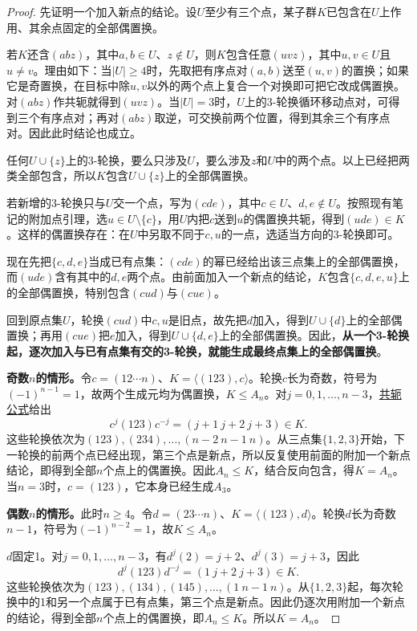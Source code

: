 \documentclass[UTF8,a4paper,11pt,fontset=windows]{ctexart}
\newcommand{\proofref}[2]{\hyperref[note:#1]{#2}}
\begin{document}
\begin{proof}
先证明一个加入新点的结论。设$U$至少有三个点，某子群$K$已包含在$U$上作用、其余点固定的全部偶置换。

若$K$还含$(abz)$，其中$a,b\in U$、$z\notin U$，则$K$包含任意$(uvz)$，其中$u,v\in U$且$u\ne v$。理由如下：当$|U|\ge4$时，先取把有序点对$(a,b)$送至$(u,v)$的置换；如果它是奇置换，在目标中除$u,v$以外的两个点上复合一个对换即可把它改成偶置换。对$(abz)$作共轭就得到$(uvz)$。当$|U|=3$时，$U$上的3-轮换循环移动点对，可得到三个有序点对；再对$(abz)$取逆，可交换前两个位置，得到其余三个有序点对。因此此时结论也成立。

任何$U\cup\{z\}$上的3-轮换，要么只涉及$U$，要么涉及$z$和$U$中的两个点。以上已经把两类全部包含，所以$K$包含$U\cup\{z\}$上的全部偶置换。

若新增的3-轮换只与$U$交一个点，写为$(cde)$，其中$c\in U$、$d,e\notin U$。按照现有笔记的附加点引理，选$u\in U\setminus\{c\}$，用$U$内把$c$送到$u$的偶置换共轭，得到$(ude)\in K$。这样的偶置换存在：在$U$中另取不同于$c,u$的一点，选适当方向的3-轮换即可。

现在先把$\{c,d,e\}$当成已有点集：$(cde)$的幂已经给出该三点集上的全部偶置换，而$(ude)$含有其中的$d,e$两个点。由前面加入一个新点的结论，$K$包含$\{c,d,e,u\}$上的全部偶置换，特别包含$(cud)$与$(cue)$。

回到原点集$U$，轮换$(cud)$中$c,u$是旧点，故先把$d$加入，得到$U\cup\{d\}$上的全部偶置换；再用$(cue)$把$e$加入，得到$U\cup\{d,e\}$上的全部偶置换。因此，\textbf{从一个3-轮换起，逐次加入与已有点集有交的3-轮换，就能生成最终点集上的全部偶置换}。

\textbf{奇数$n$的情形。}令$c=(12\cdots n)$、$K=\langle(123),c\rangle$。轮换$c$长为奇数，符号为$(-1)^{n-1}=1$，故两个生成元均为偶置换，$K\le A_n$。对$j=0,1,\ldots,n-3$，\proofref{conjugation}{共轭公式}给出
\[
c^j(123)c^{-j}=(j+1\ j+2\ j+3)\in K.
\]
这些轮换依次为$(123),(234),\ldots,(n-2\ n-1\ n)$。从三点集$\{1,2,3\}$开始，下一轮换的前两个点已经出现，第三个点是新点，所以反复使用前面的附加一个新点结论，即得到全部$n$个点上的偶置换。因此$A_n\le K$，结合反向包含，得$K=A_n$。当$n=3$时，$c=(123)$，它本身已经生成$A_3$。

\textbf{偶数$n$的情形。}此时$n\ge4$。令$d=(23\cdots n)$、$K=\langle(123),d\rangle$。轮换$d$长为奇数$n-1$，符号为$(-1)^{n-2}=1$，故$K\le A_n$。

$d$固定1。对$j=0,1,\ldots,n-3$，有$d^j(2)=j+2$、$d^j(3)=j+3$，因此
\[
d^j(123)d^{-j}=(1\ j+2\ j+3)\in K.
\]
这些轮换依次为$(123),(134),(145),\ldots,(1\ n-1\ n)$。从$\{1,2,3\}$起，每次轮换中的1和另一个点属于已有点集，第三个点是新点。因此仍逐次用附加一个新点的结论，得到全部$n$个点上的偶置换，即$A_n\le K$。所以$K=A_n$。
\end{proof}
\end{document}
